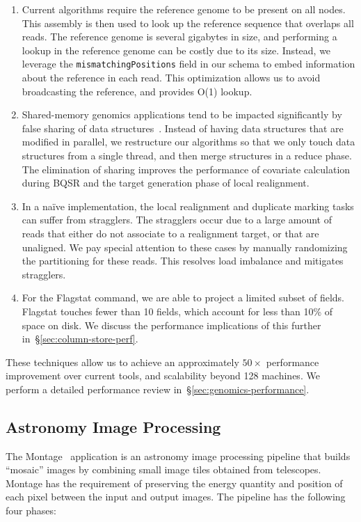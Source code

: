 \documentclass{acm_proc_article-sp}
\begin{document}
\begin{enumerate}
\item Current algorithms require the reference genome to be present on all nodes. This assembly is then used to
look up the reference sequence that overlaps all reads. The reference genome is several gigabytes in
size, and performing a lookup in the reference genome can be costly due to its size. Instead, we leverage
the \texttt{mismatchingPositions} field in our schema to embed information about the reference in each read. This
optimization allows us to avoid broadcasting the reference, and provides O(1) lookup.
\item Shared-memory genomics applications tend to be impacted significantly by false sharing of data
\linebreak structures~\cite{zaharia11}. Instead of having data structures that are modified in parallel, we
restructure our algorithms so that we only touch data structures from a single thread, and then merge
structures in a reduce phase. The elimination of sharing improves the performance of covariate calculation during
BQSR and the target generation phase of local realignment.
\item In a na\"{i}ve implementation, the local realignment and duplicate marking tasks can suffer from
stragglers. The stragglers occur due to a large amount of reads that either do not associate to a realignment
target, or that are unaligned. We pay special attention to these cases by manually randomizing the
partitioning for these reads. This resolves load imbalance and mitigates stragglers.
\item For the Flagstat command, we are able to project a limited subset of fields. Flagstat touches fewer
than 10 fields, which account for less than 10\% of space on disk. We discuss the performance
implications of this further in~\S\ref{sec:column-store-perf}.
\end{enumerate}

These techniques allow us to achieve an approximately $50\times$ performance improvement over current
tools, and scalability beyond 128 machines. We perform a detailed performance review
in~\S\ref{sec:genomics-performance}.

\subsection{Astronomy Image Processing}
\label{sec:astronomy-image-processing}

The Montage~\cite{montage} application is an astronomy image processing pipeline that builds ``mosaic'' images
by combining small image tiles obtained from telescopes. Montage has the requirement of preserving the energy
quantity and position of each pixel between the input and output images. The pipeline has the following four
phases:
\end{document}
